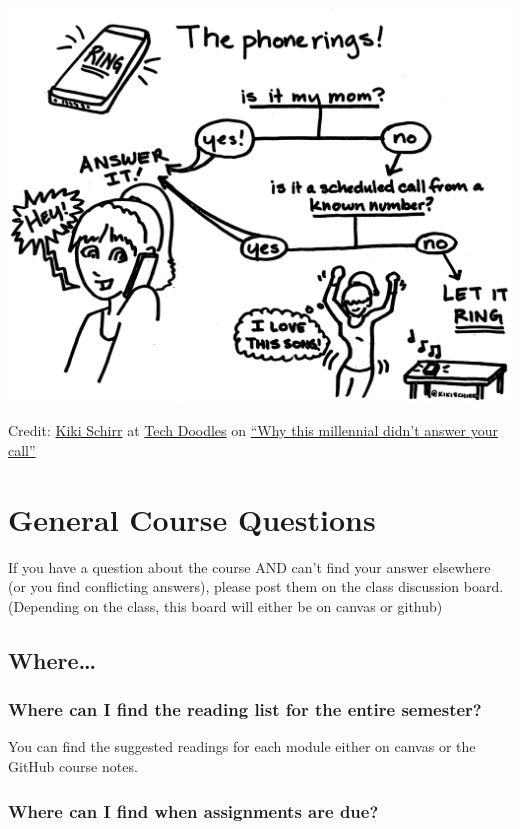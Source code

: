 \documentclass[
]{book}
\begin{document}
\begin{center}\includegraphics[width=0.5\linewidth]{img/why-this-millennial-didnt-answer-your-call} \end{center}

Credit: \href{https://kikischirr.medium.com/}{Kiki Schirr} at \href{https://medium.com/tech-doodles}{Tech Doodles} on \href{https://medium.com/tech-doodles/why-this-millennial-didnt-answer-your-call-d5abccf06cfc}{``Why this millennial didn't answer your call''}

\hypertarget{general-course-questions}{%
\section{General Course Questions}\label{general-course-questions}}

If you have a question about the course AND can't find your answer elsewhere (or you find conflicting answers), please post them on the class discussion board. (Depending on the class, this board will either be on canvas or github)

\hypertarget{where}{%
\subsection{Where\ldots{}}\label{where}}

\hypertarget{where-can-i-find-the-reading-list-for-the-entire-semester}{%
\subsubsection{Where can I find the reading list for the entire semester?}\label{where-can-i-find-the-reading-list-for-the-entire-semester}}

You can find the suggested readings for each module either on canvas or the GitHub course notes.

\hypertarget{where-can-i-find-when-assignments-are-due}{%
\subsubsection{Where can I find when assignments are due?}\label{where-can-i-find-when-assignments-are-due}}
\end{document}
